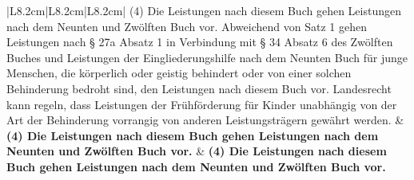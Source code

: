 \documentclass[10pt,a4paper,landscape]{article}
\begin{document}
\begin{longtable}{|L{8.2cm}|L{8.2cm}|L{8.2cm}|}
(4) Die Leistungen nach diesem Buch  \newline gehen Leistungen nach dem Neunten und  \newline Zwölften Buch vor. \textcolor{diffred}{Abweichend von Satz 1  \newline gehen Leistungen nach \S{} 27a Absatz 1 in  \newline Verbindung mit \S{} 34 Absatz 6 des Zwölften  \newline Buches und Leistungen der  \newline Eingliederungshilfe nach dem Neunten  \newline Buch für junge Menschen, die körperlich  \newline oder geistig behindert oder von einer  \newline solchen Behinderung bedroht sind, den  \newline Leistungen nach diesem Buch vor.  \newline Landesrecht kann regeln, dass Leistungen  \newline der Frühförderung für Kinder unabhängig  \newline von der Art der Behinderung vorrangig von  \newline anderen Leistungsträgern gewährt werden.} & \textbf{(4) Die Leistungen nach diesem Buch  \newline gehen Leistungen nach dem Neunten  \newline und Zwölften Buch vor. } & \textbf{(4) Die Leistungen nach diesem Buch  \newline gehen Leistungen nach dem Neunten  \newline und Zwölften Buch vor. } \\
\hhline{|---|}

\end{longtable}
\end{document}
